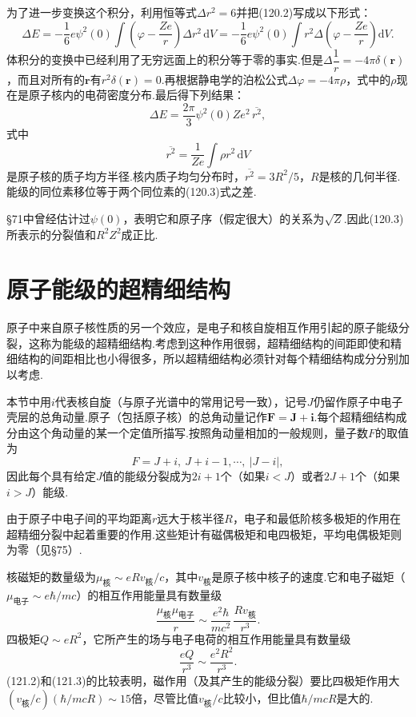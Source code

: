 为了进一步变换这个积分，利用恒等式$\Delta r^2=6$并把(120.2)写成以下形式：
\begin{equation*}
  \Delta E=-\frac{1}{6}e\psi^2(0)\int\left(\varphi-\frac{Ze}{r}\right)\Delta r^2\,\mathrm{d}V
  =-\frac{1}{6}e\psi^2(0)\int r^2\Delta\left(\varphi-\frac{Ze}{r}\right)\mathrm{d}V.
\end{equation*}
体积分的变换中已经利用了无穷远面上的积分等于零的事实.但是$\Delta\dfrac{1}{r}=-4\pi\delta(\boldsymbol{r})$，而且对所有的$\boldsymbol{r}$有$r^2\delta(\boldsymbol{r})=0$.再根据静电学的泊松公式$\Delta\varphi=-4\pi\rho$，式中的$\rho$现在是原子核内的电荷密度分布.最后得下列结果：
\begin{equation}
  \Delta E=\frac{2\pi}{3}\psi^2(0)Ze^2\,\overline{r^2},
\end{equation}
式中
\begin{equation*}
  \overline{r^2}=\frac{1}{Ze}\int\rho r^2\,\mathrm{d}V
\end{equation*}
是原子核的质子均方半径.核内质子均匀分布时，$\overline{r^2}=3R^2/5$，$R$是核的几何半径.能级的同位素移位等于两个同位素的(120.3)式之差.

§71中曾经估计过$\psi(0)$，表明它和原子序（假定很大）的关系为$\sqrt{Z}$.因此(120.3)所表示的分裂值和$R^2Z^2$成正比.

\section{原子能级的超精细结构}

原子中来自原子核性质的另一个效应，是电子和核自旋相互作用引起的原子能级分裂，这称为能级的超精细结构.考虑到这种作用很弱，超精细结构的间距即使和精细结构的间距相比也小得很多，所以超精细结构必须针对每个精细结构成分分别加以考虑.

本节中用$i$代表核自旋（与原子光谱中的常用记号一致），记号$J$仍留作原子中电子壳层的总角动量.原子（包括原子核）的总角动量记作$\boldsymbol{F}=\boldsymbol{J}+\boldsymbol{i}$.每个超精细结构成分由这个角动量的某一个定值所描写.按照角动量相加的一般规则，量子数$F$的取值为
\begin{equation}
  F=J+i,\ J+i-1,\cdots,\ |J-i|,
\end{equation}
因此每个具有给定$J$值的能级分裂成为$2i+1$个（如果$i<J$）或者$2J+1$个（如果$i>J$）能级.

由于原子中电子间的平均距离$r$远大于核半径$R$，电子和最低阶核多极矩的作用在超精细分裂中起着重要的作用.这些矩计有磁偶极矩和电四极矩，平均电偶极矩则为零（见§75）.

核磁矩的数量级为$\mu_{\text{核}}\sim eRv_{\text{核}}/c$，其中$v_{\text{核}}$是原子核中核子的速度.它和电子磁矩（$\mu_{\text{电子}}\sim e\hbar/mc$）的相互作用能量具有数量级
\begin{equation}
  \frac{\mu_{\text{核}}\mu_{\text{电子}}}{r}
  \sim\frac{e^2\hbar}{mc^2}\,\frac{Rv_{\text{核}}}{r^3}.
\end{equation}
四极矩$Q\sim eR^2$，它所产生的场与电子电荷的相互作用能量具有数量级
\begin{equation}
  \frac{eQ}{r^3}\sim\frac{e^2R^2}{r^3}.
\end{equation}
(121.2)和(121.3)的比较表明，磁作用（及其产生的能级分裂）要比四极矩作用大$\left(v_{\text{核}}/c\right)\left(\hbar/mcR\right)\sim15$倍，尽管比值$v_{\text{核}}/c$比较小，但比值$\hbar/mcR$是大的.

